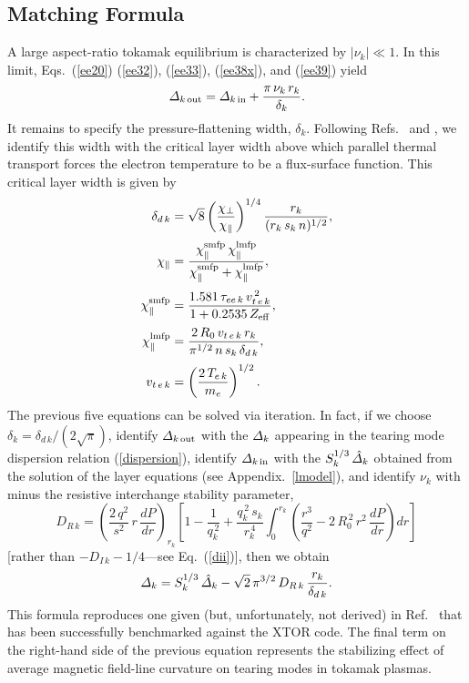 \documentclass[12pt,prb,aps]{revtex4-1}
\begin{document}
\subsection{Matching Formula}\label{match}
A large aspect-ratio tokamak equilibrium is characterized by $|\nu_k|\ll 1$. In this limit, Eqs.~(\ref{ee20}) (\ref{ee32}), (\ref{ee33}), (\ref{ee38x}), and (\ref{ee39}) yield
\begin{equation}
 {\mit\Delta}_{k\,{\rm out}} = {\mit\Delta}_{k\,{\rm in}}+ \frac{\pi\,\nu_k\,r_k}{\delta_k}.
 \end{equation}
It remains to specify the pressure-flattening width, $\delta_k$. Following Refs.~ and , we identify this width with the critical layer width above
which parallel thermal transport forces the electron temperature to be a flux-surface function. This critical layer width is given by\,\cite{hel,hel1}
\begin{align}
\delta_{d\,k}&= \sqrt{8}\left(\frac{\chi_\perp}{\chi_\parallel}\right)^{1/4}
\frac{r_k}{(r_k\,s_k\,n)^{1/2}},\\[0.5ex]
\chi_\parallel &= \frac{\chi_\parallel^{\rm smfp} \,\chi_\parallel^{\rm lmfp}}{\chi_\parallel^{\rm smfp}+\chi_\parallel^{\rm lmfp}},\\[0.5ex]
\chi_\parallel^{\rm smfp} &= \frac{1.581\,\tau_{ee\,k}\,v_{t\,e\,k}^{\,2}}{1+ 0.2535\,Z_{\rm eff}},\\[0.5ex]
\chi_\parallel^{\rm lmfp}&= \frac{2\,R_0\,v_{t\,e\,k}\,r_k}{\pi^{1/2}\,n\,s_k\,\delta_{d\,k}},\\[0.5ex]
v_{t\,e\,k} &= \left(\frac{2\,T_{e\,k}}{m_e}\right)^{1/2}.
\end{align}
The previous five equations can be solved via iteration. In fact, if we choose $\delta_k= \delta_{d\,k}/(2\sqrt{\pi})$, identify ${\mit\Delta}_{k\,{\rm out}}$ with the
${\mit\Delta}_k$ appearing in the tearing mode dispersion relation (\ref{dispersion}), identify ${\mit\Delta}_{k\,{\rm in}}$ with the $S_k^{1/3}\,\hat{\mit\Delta}_k$
obtained from the solution of the layer equations (see Appendix.~\ref{lmodel}), and identify $\nu_k$ with minus the resistive interchange stability parameter,\cite{ggj,ggj1}
\begin{equation}\label{dr}
D_{R\,k} = \left(\frac{2\,q^2}{s^2}\,r\,\frac{dP}{dr}\right)_{r_k}\left[1-\frac{1}{q_k^{\,2}}+ \frac{q_k^{\,2}\,s_k}{r_k^{\,4}}\int_0^{r_k}
\left(\frac{r^3}{q^2} -2\,R_0^{\,2}\,r^2\,\frac{dP}{dr}\right)dr\right]
\end{equation}
 [rather than $-D_{I\,k}-1/4$---see Eq.~(\ref{dii})],\cite{kot}
then we obtain
\begin{equation}
{\mit\Delta}_k = S_k^{1/3}\,\hat{\mit\Delta}_k - \sqrt{2}\,\pi^{3/2}\,D_{R\,k}\,\frac{r_k}{\delta_{d\,k}}.
\end{equation}
This formula reproduces one given (but, unfortunately,  not derived) in Ref.~ that has been successfully benchmarked against the XTOR code. The final term on the right-hand side
of the previous equation represents the stabilizing effect of average magnetic field-line curvature on tearing modes in tokamak plasmas. 
\end{document}
